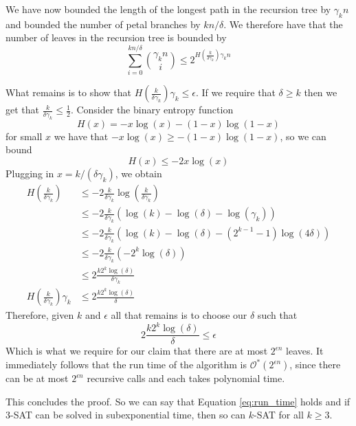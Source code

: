We have now bounded the length of the longest path in the recursion tree by $\gamma_k n$
and bounded the number of petal branches by $kn / \delta$.
We therefore have that the number of leaves in the recursion tree is bounded by
\begin{equation*}
    \sum_{i=0}^{kn / \delta} \binom{\gamma_k n}{i} \leq 2^{H(\frac{k}{\delta \gamma_k})\gamma_k n}
\end{equation*}

What remains is to show that $H(\frac{k}{\delta \gamma_k})\gamma_k \leq \epsilon$.
If we require that $\delta \geq k$ then we get that $\frac{k}{\delta \gamma_k} \leq \frac{1}{2}$.
Consider the binary entropy function
\begin{equation}
    H(x) = -x\log(x) - (1-x)\log(1-x)
\end{equation}
for small $x$ we have that $-x\log(x) \geq -(1-x)\log(1-x)$, so we can bound
\begin{equation}
    H(x) \leq -2x\log(x)
\end{equation}
Plugging in $x = k / (\delta \gamma_k)$, we obtain
\begin{align*}
    H(\frac{k}{\delta \gamma_k}) &\leq -2 \frac{k}{\delta \gamma_k} \log(\frac{k}{\delta \gamma_k}) \\
    &\leq -2 \frac{k}{\delta \gamma_k} (\log(k) - \log(\delta) - \log(\gamma_k)) \\
    &\leq -2 \frac{k}{\delta \gamma_k} (\log(k) - \log(\delta) - (2^{k-1} - 1)\log(4\delta)) \\
    &\leq -2 \frac{k}{\delta \gamma_k} (- 2^{k}\log(\delta)) \\
    &\leq 2 \frac{k2^{k}\log(\delta)}{\delta \gamma_k} \\
    H(\frac{k}{\delta \gamma_k})\gamma_k &\leq 2 \frac{k2^{k}\log(\delta)}{\delta}
\end{align*}
Therefore, given $k$ and $\epsilon$ all that remains is to choose our $\delta$ such that
\begin{equation}
    2 \frac{k2^{k}\log(\delta)}{\delta} \leq \epsilon
\end{equation}
Which is what we require for our claim that there are at most $2^{\epsilon n}$ leaves.
It immediately follows that the run time of the algorithm is $\mathcal{O}^{\ast}(2^{\epsilon n})$, since
there can be at most $2^{\epsilon n}$ recursive calls and each takes polynomial time.

This concludes the proof. So we can say that Equation \ref{eq:run_time} holds and if 3-SAT
can be solved in subexponential time, then so can $k$-SAT for all $k \geq 3$.

